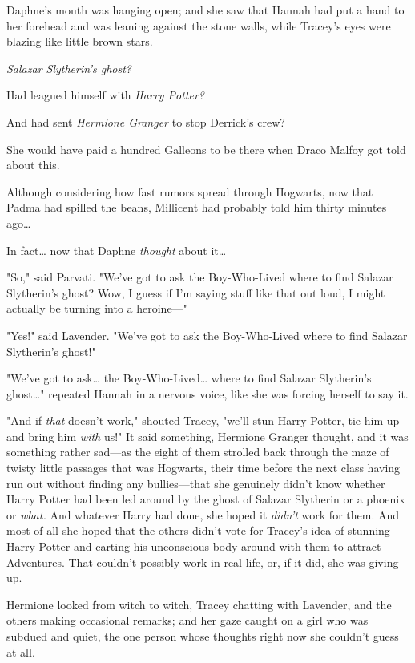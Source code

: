 Daphne's mouth was hanging open; and she saw that Hannah had put a hand to her 
forehead and was leaning against the stone walls, while Tracey's eyes were 
blazing like little brown stars.

\emph{Salazar Slytherin's ghost?}

Had leagued himself with \emph{Harry Potter?}

And had sent \emph{Hermione Granger} to stop Derrick's crew?

She would have paid a hundred Galleons to be there when Draco Malfoy got told 
about this.

Although considering how fast rumors spread through Hogwarts, now that Padma 
had spilled the beans, Millicent had probably told him thirty minutes 
ago{\ldots}

In fact{\ldots} now that Daphne \emph{thought} about it{\ldots}

"So," said Parvati. "We've got to ask the Boy-Who-Lived where to find Salazar 
Slytherin's ghost? Wow, I guess if I'm saying stuff like that out loud, I might 
actually be turning into a heroine---"

"Yes!" said Lavender. "We've got to ask the Boy-Who-Lived where to find Salazar 
Slytherin's ghost!"

"We've got to ask{\ldots} the Boy-Who-Lived{\ldots} where to find Salazar 
Slytherin's ghost{\ldots}" repeated Hannah in a nervous voice, like she was 
forcing herself to say it.

"And if \emph{that} doesn't work," shouted Tracey, "we'll stun Harry Potter, 
tie him up and bring him \emph{with} us!"
\sbreak
It said something, Hermione Granger thought, and it was something rather 
sad---as the eight of them strolled back through the maze of twisty little 
passages that was Hogwarts, their time before the next class having run out 
without finding any bullies---that she genuinely didn't know whether Harry 
Potter had been led around by the ghost of Salazar Slytherin or a phoenix or 
\emph{what.} And whatever Harry had done, she hoped it \emph{didn't} work for 
them. And most of all she hoped that the others didn't vote for Tracey's idea 
of stunning Harry Potter and carting his unconscious body around with them to 
attract Adventures. That couldn't possibly work in real life, or, if it did, 
she was giving up.

Hermione looked from witch to witch, Tracey chatting with Lavender, and the 
others making occasional remarks; and her gaze caught on a girl who was subdued 
and quiet, the one person whose thoughts right now she couldn't guess at all.

